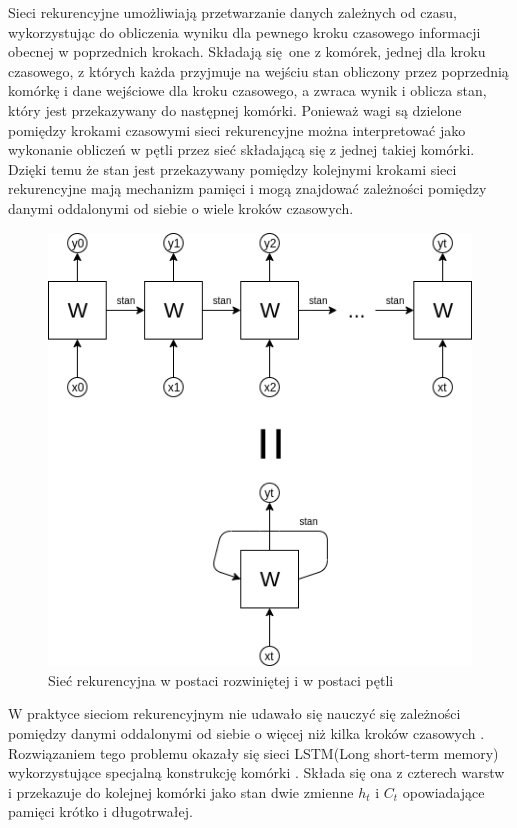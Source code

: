 \documentclass[a4paper,11pt,twoside]{report}
\theoremstyle{definition}
\begin{document}
Sieci rekurencyjne umożliwiają przetwarzanie danych zależnych od czasu, wykorzystując do obliczenia wyniku dla pewnego kroku czasowego informacji obecnej w poprzednich krokach. Składają się one z komórek, jednej dla kroku czasowego, z których każda przyjmuje na wejściu stan obliczony przez poprzednią komórkę i dane wejściowe dla kroku czasowego,  a zwraca wynik i oblicza stan, który jest przekazywany do następnej komórki. Ponieważ wagi są dzielone pomiędzy krokami czasowymi sieci rekurencyjne można interpretować jako wykonanie obliczeń w pętli przez sieć składającą się z jednej takiej komórki. Dzięki temu że stan jest przekazywany pomiędzy kolejnymi krokami sieci rekurencyjne mają mechanizm pamięci i mogą znajdować zależności pomiędzy danymi oddalonymi od siebie o wiele kroków czasowych. \cite{rnn}

\begin{figure}[h!]
	\centering
	\includegraphics[scale=0.5]{rnn}
	\caption{Sieć rekurencyjna w postaci rozwiniętej i w postaci pętli}
\end{figure}

W praktyce sieciom rekurencyjnym nie udawało się nauczyć się zależności pomiędzy danymi oddalonymi od siebie o więcej niż kilka kroków czasowych \cite{rnnDifficulty}. Rozwiązaniem tego problemu okazały się sieci LSTM(Long short-term memory) wykorzystujące specjalną konstrukcję komórki \cite{lstm}. Składa się ona z czterech warstw i przekazuje do kolejnej komórki jako stan dwie zmienne $h_t$ i $C_t$ opowiadające pamięci krótko i długotrwałej.  
\end{document}
